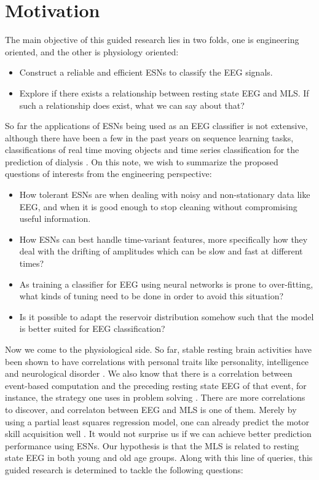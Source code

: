 \documentclass[a4paper,11pt,oneside]{article}
\begin{document}
\section{Motivation}
The main objective of this guided research lies in two folds, one is engineering oriented, and the other is physiology oriented:
\begin{itemize}
	\item Construct a reliable and efficient ESNs to classify the EEG signals.
	\item Explore if there exists a relationship between resting state EEG and MLS. If such a relationship does exist, what we can say about that?
\end{itemize} 

So far the applications of ESNs being used as an EEG classifier is not extensive, although there have been a few in the past years on sequence learning tasks, classifications of real time moving objects \cite{mitul2013classification} and time series classification for the prediction of dialysis \cite{ongenae2013time}. On this note, we wish to summarize the proposed questions of interests from the engineering perspective:
\begin{itemize}
	\item How tolerant ESNs are when dealing with  noisy and non-stationary data like EEG, and when it is good enough to stop cleaning without compromising  useful information.  
	\item How ESNs can best handle time-variant features, more specifically how they deal with the drifting of amplitudes which can be slow and fast at different times?
	\item As training a classifier for EEG using neural networks is prone to over-fitting, what kinds of tuning need to be done in order to avoid this situation?
	\item Is it possible to adapt the reservoir distribution somehow such that the model is better suited for EEG classification?
\end{itemize}

Now we come to the physiological side. So far, stable resting brain activities have been shown to have correlations with personal traits like personality, intelligence and neurological disorder \cite{thatcher2005eeg}\cite{davidson2003affective}. We also know that there is a correlation between event-based computation and the preceding resting state EEG of that event, for instance, the strategy one uses in problem solving \cite{kounios2008origins}. There are more correlations to discover, and correlaton between EEG and MLS is one of them. Merely by using a partial least squares regression model, one can already predict the motor skill acquisition well \cite{wu2014resting}. It would not surprise us if we can achieve better prediction performance using ESNs. Our hypothesis is that the MLS is related to resting state EEG in both young and old age groups. Along with this line of queries, this guided research is determined to tackle the following questions: 
\end{document}
